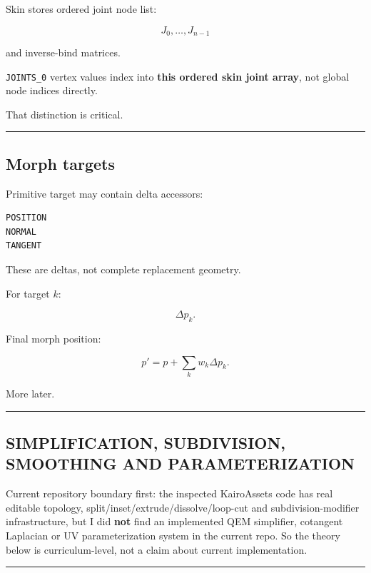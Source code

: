 Skin stores ordered joint node list:

\[
J_0,\dots,J_{n-1}
\]

and inverse-bind matrices.

\texttt{JOINTS\_0} vertex values index into \textbf{this ordered skin joint array}, not global node indices directly.

That distinction is critical.

\begin{center}\rule{0.5\linewidth}{0.5pt}\end{center}

\subsection{Morph targets}\label{04-visual-computing-ii-ch041-morph-targets}

Primitive target may contain delta accessors:

\begin{verbatim}
POSITION
NORMAL
TANGENT
\end{verbatim}

These are deltas, not complete replacement geometry.

For target \(k\):

\[
\Delta p_k.
\]

Final morph position:

\[
p'=p+\sum_k w_k\Delta p_k.
\]

More later.

\begin{center}\rule{0.5\linewidth}{0.5pt}\end{center}

\subsection{SIMPLIFICATION, SUBDIVISION, SMOOTHING AND PARAMETERIZATION}\label{04-visual-computing-ii-ch041-simplification-subdivision-smoothing-and-parameterization}

Current repository boundary first: the inspected KairoAssets code has real editable topology, split/inset/extrude/dissolve/loop-cut and subdivision-modifier infrastructure, but I did \textbf{not} find an implemented QEM simplifier, cotangent Laplacian or UV parameterization system in the current repo. So the theory below is curriculum-level, not a claim about current implementation.

\begin{center}\rule{0.5\linewidth}{0.5pt}\end{center}

